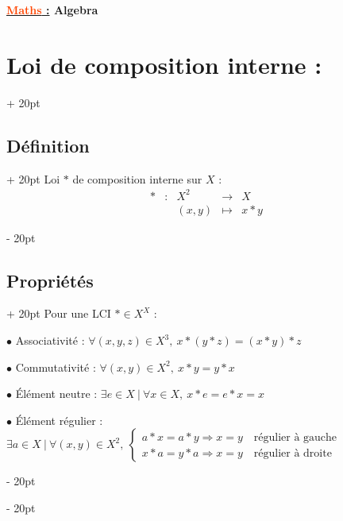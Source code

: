 \documentclass[a4paper, 12pt, twoside]{article}
\renewcommand{\emph}{\textcolor{ff4500}}
\newcommand{\ind}[1][20pt]{\advance\leftskip + #1}
\newcommand{\deind}[1][20pt]{\advance\leftskip - #1}
\newenvironment{indentedenv}[1][20pt]{\par \ind[#1]}{\par \deind}
\newenvironment{indt}[2][20pt]{#2 \begin{indentedenv}[#1]}{\end{indentedenv}} %
\newcommand{\thetitle}[2]{\begin{center}\textbf{{\LARGE \underline{\emph{#1} :}} {\Large #2}}\end{center}}
\begin{document}
    \thetitle{Maths}{Algebra}
    
    \tableofcontents
    \newpage
    
    \begin{indt}{\section{Loi de composition interne :}}
        
        \begin{indt}{\subsection{Définition}}
            Loi $*$ de composition interne sur $X$ :
            \[
                \begin{array}{rcccl}
                    * &:& X^2 &\longrightarrow& X
                    \\
                    &&(x, y) &\longmapsto& x * y
                \end{array}
            \]
        \end{indt}
        
        \vspace{6pt}
        
        \begin{indt}{\subsection{Propriétés}}
            Pour une LCI $* \in X^X$ :
            
            \vspace{6pt}
            
            $\bullet$ Associativité : $\forall (x, y, z) \in X^3,\ x*(y*z) = (x*y)*z$
            
            \vspace{6pt}
            
            $\bullet$ Commutativité : $\forall (x, y) \in X^2,\ x*y = y*x$
            
            \vspace{6pt}
            
            $\bullet$ \'Elément neutre : $\exists e \in X\ |\ \forall x \in X,\ x*e = e*x = x$
            
            \vspace{6pt}
            
            $\bullet$ \'Elément régulier :
            $
                \exists a \in X\ |\ \forall (x, y) \in X^2,\
                \begin{cases}
                    a*x = a*y \Rightarrow x = y \quad \text{régulier à gauche}
                    \\
                    x*a = y*a \Rightarrow x = y \quad \text{régulier à droite}
                \end{cases}
            $
            

\end{indt}
\end{indt}
\end{document}
